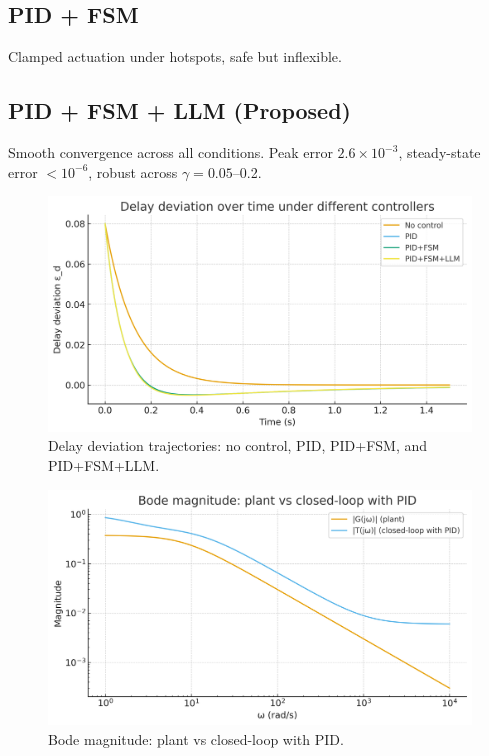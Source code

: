 \documentclass[conference]{IEEEtran}
\begin{document}
\subsection{PID + FSM}
Clamped actuation under hotspots, safe but inflexible.  

\subsection{PID + FSM + LLM (Proposed)}
Smooth convergence across all conditions. Peak error $2.6 \times 10^{-3}$, steady-state error $<10^{-6}$, robust across $\gamma=0.05$--0.2.  

\begin{figure}[h]
\centering
\includegraphics[width=0.9\columnwidth]{figs/fig2_time_response.png}
\caption{Delay deviation trajectories: no control, PID, PID+FSM, and PID+FSM+LLM.}
\label{fig:time}
\end{figure}

\begin{figure}[h]
\centering
\includegraphics[width=0.9\columnwidth]{figs/fig3_bode_magnitude.png}
\caption{Bode magnitude: plant vs closed-loop with PID.}
\label{fig:bode}
\end{figure}
\end{document}
